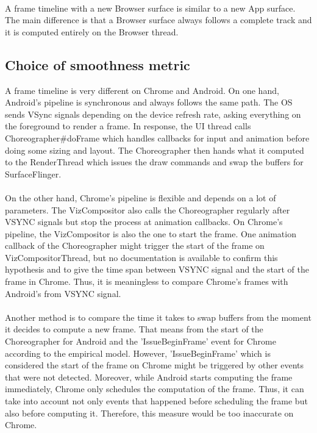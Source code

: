 \documentclass{kththesis}
\begin{document}
\paragraph{}
A frame timeline with a new Browser surface is similar to a new App surface. The main difference is that a Browser surface always follows a complete track and it is computed entirely on the Browser thread.

\subsection{Choice of smoothness metric}
\label{results:metric}

A frame timeline is very different on Chrome and Android. 
On one hand, Android's pipeline is synchronous and always follows the same path. The OS sends VSync signals depending on the device refresh rate, asking everything on the foreground to render a frame. In response, the UI thread calls Choreographer\#doFrame which handles callbacks for input and animation before doing some sizing and layout. The Choreographer then hands what it computed to the RenderThread which issues the draw commands and swap the buffers for SurfaceFlinger.

\paragraph{}
 On the other hand, Chrome's pipeline is flexible and depends on a lot of parameters. The VizCompositor also calls the Choreographer regularly after VSYNC signals but stop the process at animation callbacks. On Chrome's pipeline, the VizCompositor is also the one to start the frame. One animation callback of the Choreographer might trigger the start of the frame on VizCompositorThread, but no documentation is available to confirm this hypothesis and to give the time span between VSYNC signal and the start of the frame in Chrome. \newline
Thus, it is meaningless to compare Chrome's frames with Android's from VSYNC signal.

\paragraph{}
Another method is to compare the time it takes to swap buffers from the moment it decides to compute a new frame. That means from the start of the Choreographer for Android and the 'IssueBeginFrame' event for Chrome according to the empirical model. However, 'IssueBeginFrame' which is considered the start of the frame on Chrome might be triggered by other events that were not detected. Moreover, while Android starts computing the frame immediately, Chrome only schedules the computation of the frame. Thus, it can take into account not only events that happened before scheduling the frame but also before computing it.  
Therefore, this measure would be too inaccurate on Chrome. \newline
\end{document}
